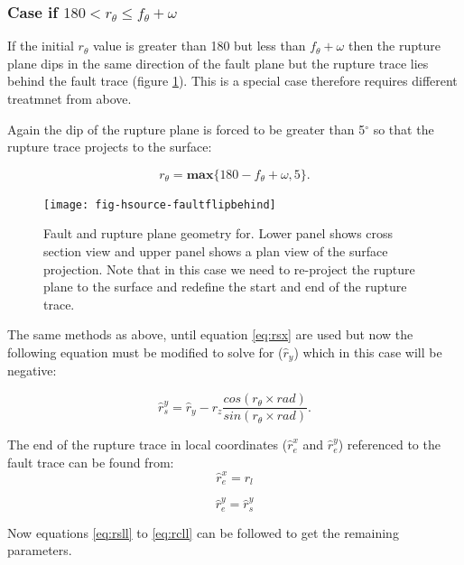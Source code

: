 \subsubsection{Case if  $180 <  r_\theta \leq f_\theta + \omega$} \label{sec:180to270}

If the initial $r_\theta$ value is greater than 180 but less than $f_\theta + \omega$ then the rupture 
plane dips in the same direction of the fault plane but the rupture trace lies behind the fault trace (figure \ref{fig:gt180}). This is a special case therefore requires different
treatmnet from above.

Again the dip of the rupture plane is forced to be greater than 5$^\circ$ so 
that the rupture trace projects to the surface:

\begin{equation}
r_\theta = \mathbf{max} \{ 180 - f_\theta + \omega, 5 \} .
\end{equation}

\begin{figure}[htp]
\centerline{\texttt{[image: fig-hsource-faultflipbehind]}}
\caption{Fault and rupture plane geometry for. Lower panel shows cross section view and upper panel shows 
a plan view of the surface projection. Note that in this case we need to re-project the rupture plane to 
the surface and redefine the start and end of the rupture trace.}
\label{fig:gt180}
\end{figure}

The same methods as above, until equation \ref{eq:rsx} are used but now the following equation must be modified
to solve for ($\hat{r}_y$) which in this case will be negative:

\begin{equation}\label{eq:ry4}
\hat{r}_s^y = \hat{r}_y -  r_z  \frac{cos(r_\theta  \times rad)}{sin(r_\theta \times rad)}.
\end{equation}

The end of the rupture trace in local coordinates ($\hat{r}_e^x$ and $\hat{r}_e^y$) referenced to the fault 
trace can be found from:
\begin{equation}
\hat{r}_e^x = r_l
\end{equation}

\begin{equation}
\hat{r}_e^y = \hat{r}_s^y
\end{equation}

Now equations \ref{eq:rsll} to \ref{eq:rcll} can be followed to get the remaining parameters.


